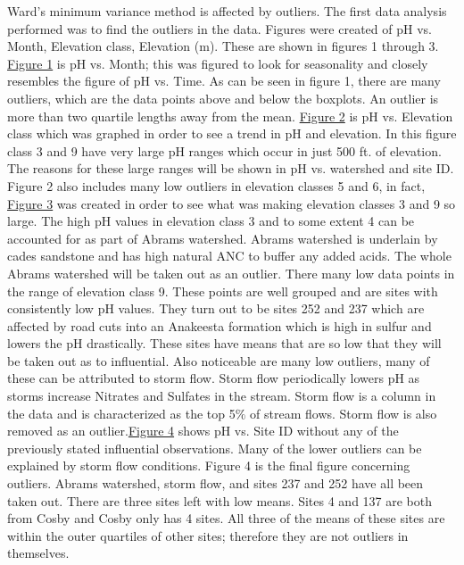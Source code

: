 Ward’s minimum variance method is affected by outliers.  The first data analysis performed was to find the outliers in the data.  Figures were created of pH vs. Month, Elevation class, Elevation (m).  These are shown in figures 1 through 3.  \hyperref[CAGraph1]{Figure 1} is pH vs. Month; this was figured to look for seasonality and closely resembles the figure of pH vs. Time.  As can be seen in figure 1, there are many outliers, which are the data points above and below the boxplots.  An outlier is more than two quartile lengths away from the mean.  \hyperref[CAGraph2]{Figure 2} is pH vs. Elevation class which was graphed in order to see a trend in pH and elevation.  In this figure class 3 and 9 have very large pH ranges which occur in just 500 ft. of elevation.  The reasons for these large ranges will be shown in pH vs. watershed and site ID.  Figure 2 also includes many low outliers in elevation classes 5 and 6, in fact, \hyperref[CAGraph3]{Figure 3} was created in order to see what was making elevation classes 3 and 9 so large.  The high pH values in elevation class 3 and to some extent 4 can be accounted for as part of Abrams watershed.  Abrams watershed is underlain by cades sandstone and has high natural ANC to buffer any added acids.  The whole Abrams watershed will be taken out as an outlier.  There many low data points in the range of elevation class 9.  These points are well grouped and are sites with consistently low pH values.  They turn out to be sites 252 and 237 which are affected by road cuts into an Anakeesta formation which is high in sulfur and  lowers the pH drastically.  These sites have means that are so low that they will be taken out as to influential.    Also noticeable are many low outliers, many of these can be attributed to storm flow.  Storm flow periodically lowers pH as storms increase Nitrates and Sulfates in the stream.  Storm flow is a column in the data and is characterized as the top 5$\%$ of stream flows.  Storm flow is also removed as an outlier.\hyperref[CAGraph6]{Figure 4} shows pH vs. Site ID without any of the previously stated influential observations.  Many of the lower outliers can be explained by storm flow conditions.  Figure 4 is the final figure concerning outliers.  Abrams watershed, storm flow, and sites 237 and 252 have all been taken out.  There are three sites left with low means.  Sites 4 and 137 are both from Cosby and Cosby only has 4 sites.  All three of the means of these sites are within the outer quartiles of other sites; therefore they are not outliers in themselves.
    
